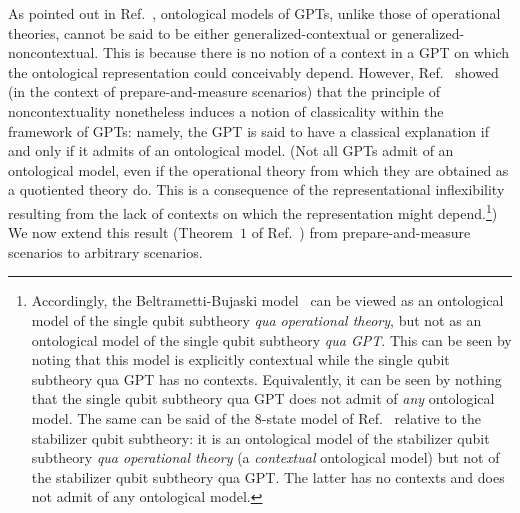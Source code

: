 \documentclass[10pt,twocolumn,aps,groupedaddress,nofootinbib]{revtex4}
\begin{document}
As pointed out in Ref.~\cite{schmid2019characterization}, ontological models of GPTs, unlike those of operational theories, cannot be said to be either generalized-contextual or generalized-noncontextual. This is because there is no notion of a context in a GPT on which the ontological representation could conceivably depend.
However, Ref.~\cite{schmid2019characterization} showed (in the context of prepare-and-measure scenarios) that the principle of noncontextuality nonetheless induces a notion of classicality within the framework of GPTs: namely, the GPT is said to have a classical explanation if and only if it admits of an ontological model. (Not all GPTs admit of an ontological model, even if the operational theory from which they are obtained as a quotiented theory do. This is a consequence of the representational inflexibility resulting from the lack of contexts on which the representation might depend.\footnote{
Accordingly, the Beltrametti-Bujaski model~\cite{Beltrametti_1995} can be viewed as an ontological model of the single qubit subtheory {\em qua operational theory}, but not as an ontological model of the single qubit subtheory {\em qua GPT}.  This can be seen by noting that this model is explicitly contextual while the single qubit subtheory qua GPT has no contexts.  Equivalently, it can be seen by nothing that  the single qubit subtheory qua GPT does not admit of {\em any} ontological model.  The same can be said of the $8$-state model of Ref.~\cite{8state} relative to the stabilizer qubit subtheory: it is an ontological model of the stabilizer qubit subtheory {\em qua operational theory} (a {\em contextual} ontological model) but not of the stabilizer qubit subtheory qua GPT.  The latter has no contexts and does not admit of any ontological model.}) We now extend this result (Theorem~$1$ of Ref.~\cite{schmid2019characterization}) from prepare-and-measure scenarios to arbitrary scenarios.
\end{document}
